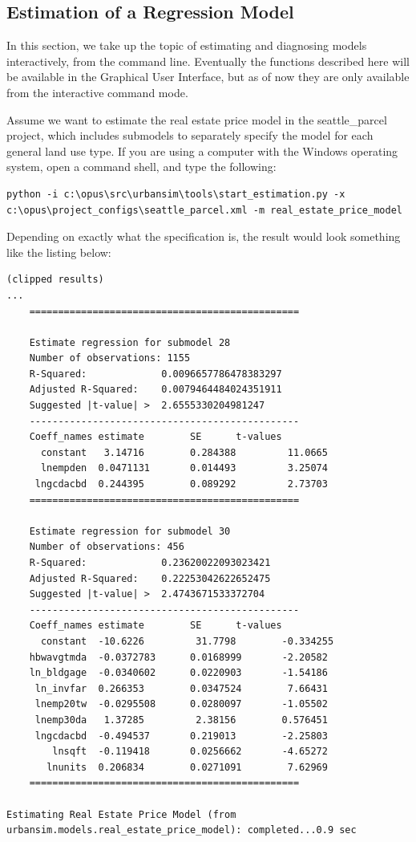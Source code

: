 \subsection{Estimation of a Regression Model}

In this section, we take up the topic of estimating and diagnosing models interactively, from the command line.  Eventually the functions described here will be available in the Graphical User Interface, but as of now they are only available from the interactive command mode.

Assume we want to estimate the real estate price model in the seattle\_parcel project, which includes submodels to separately specify the model for each general land use type.  If you are using a computer with the Windows operating system, open a command shell, and type the following:

\begin{lstlisting}
python -i c:\opus\src\urbansim\tools\start_estimation.py -x c:\opus\project_configs\seattle_parcel.xml -m real_estate_price_model
\end{lstlisting}

Depending on exactly what the specification is, the result would look something like the listing below:\\

\begin{lstlisting}
(clipped results)
...
    ===============================================

    Estimate regression for submodel 28
    Number of observations: 1155
    R-Squared:             0.0096657786478383297
    Adjusted R-Squared:    0.0079464484024351911
    Suggested |t-value| >  2.6555330204981247
    -----------------------------------------------
    Coeff_names estimate        SE      t-values
      constant   3.14716        0.284388         11.0665
      lnempden  0.0471131       0.014493         3.25074
     lngcdacbd  0.244395        0.089292         2.73703
    ===============================================

    Estimate regression for submodel 30
    Number of observations: 456
    R-Squared:             0.23620022093023421
    Adjusted R-Squared:    0.22253042622652475
    Suggested |t-value| >  2.4743671533372704
    -----------------------------------------------
    Coeff_names estimate        SE      t-values
      constant  -10.6226         31.7798        -0.334255
    hbwavgtmda  -0.0372783      0.0168999       -2.20582
    ln_bldgage  -0.0340602      0.0220903       -1.54186
     ln_invfar  0.266353        0.0347524        7.66431
     lnemp20tw  -0.0295508      0.0280097       -1.05502
     lnemp30da   1.37285         2.38156        0.576451
     lngcdacbd  -0.494537       0.219013        -2.25803
        lnsqft  -0.119418       0.0256662       -4.65272
       lnunits  0.206834        0.0271091        7.62969
    ===============================================

Estimating Real Estate Price Model (from urbansim.models.real_estate_price_model): completed...0.9 sec
\end{lstlisting}

